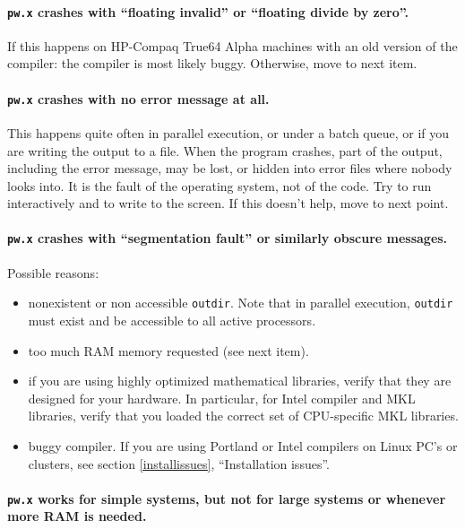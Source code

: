 \documentclass[12pt,a4paper]{article}
\begin{document}
\paragraph{\texttt{pw.x} crashes with ``floating invalid'' or ``floating divide by zero''.}

If this happens on HP-Compaq True64 Alpha machines with an old
version of the compiler: the compiler is most likely buggy.
Otherwise, move to next item.

\paragraph{\texttt{pw.x} crashes with no error message at all.}

This happens quite often in parallel execution, or under a batch
queue, or if you are writing the output to a file.
When the program crashes, part of the output, including the error
message, may be lost, or hidden into error files where nobody looks
into.
It is the fault of the operating system, not of the code.
Try to run interactively and to write to the screen.
If this doesn't help, move to next point.

\paragraph{\texttt{pw.x} crashes with ``segmentation fault'' or
           similarly obscure messages.}

Possible reasons:
\begin{itemize}
  \item
    nonexistent or non accessible {\tt outdir}. 
    Note that in parallel execution, {\tt outdir} must exist and be
    accessible to all active processors.
  \item
    too much RAM memory requested (see next item).
  \item
    if you are using highly optimized mathematical libraries, verify
    that they are designed for your hardware.
    In particular, for Intel compiler and MKL libraries, verify that
    you loaded the correct set of CPU-specific MKL libraries.
  \item
    buggy compiler.
    If you are using Portland or Intel compilers on Linux PC's or
    clusters, see section \ref{installissues}, ``Installation
    issues''.
\end{itemize}

\paragraph{\texttt{pw.x} works for simple systems, but not for large
           systems or whenever more RAM is needed.}
\end{document}
